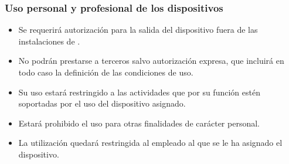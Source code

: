 
\subsubsection{Uso personal y profesional de los dispositivos}

\begin{itemize}
    \item Se requerirá autorización para la salida del dispositivo fuera de las instalaciones de \Beneficiario{}.
    \item No podrán prestarse a terceros salvo autorización expresa, que incluirá en todo caso la definición de las condiciones de uso.
    \item Su uso estará restringido a las actividades que por su función estén soportadas por el uso del dispositivo asignado.
    \item Estará prohibido el uso para otras finalidades de carácter personal.
    \item La utilización quedará restringida al empleado al que se le ha asignado el dispositivo.
\end{itemize}
